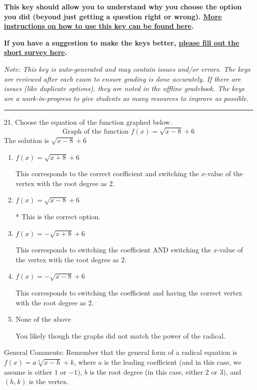 \documentclass{extbook}[14pt]
\begin{document}
\textbf{This key should allow you to understand why you choose the option you did (beyond just getting a question right or wrong). \href{https://xronos.clas.ufl.edu/mac1105spring2020/courseDescriptionAndMisc/Exams/LearningFromResults}{More instructions on how to use this key can be found here}.}

\textbf{If you have a suggestion to make the keys better, \href{https://forms.gle/CZkbZmPbC9XALEE88}{please fill out the short survey here}.}

\textit{Note: This key is auto-generated and may contain issues and/or errors. The keys are reviewed after each exam to ensure grading is done accurately. If there are issues (like duplicate options), they are noted in the offline gradebook. The keys are a work-in-progress to give students as many resources to improve as possible.}

\rule{\textwidth}{0.4pt}

21. Choose the equation of the function graphed below.
\[ \text{Graph of the function } f(x) = \sqrt{x - 8} + 6 \] 
The solution is $ \sqrt{x - 8} + 6 $ 

\begin{enumerate}[label=\Alph*.] 
\item $ f(x) = \sqrt{x + 8} + 6 $ 

 This corresponds to the correct coefficient and switching the $x$-value of the vertex with the root degree as $2$. 
\item $ f(x) = \sqrt{x - 8} + 6 $ 

 * This is the correct option. 
\item $ f(x) = - \sqrt{x + 8} + 6 $ 

 This corresponds to switching the coefficient AND switching the $x$-value of the vertex with the root degree as $2$. 
\item $ f(x) = - \sqrt{x - 8} + 6 $ 

 This corresponds to switching the coefficient and having the correct vertex with the root degree as $2$. 
\item $ \text{None of the above} $ 

 You likely though the graphs did not match the power of the radical. 
\end{enumerate} 
 
General Comments: Remember that the general form of a radical equation is $ f(x) = a \sqrt[b]{x - h} + k$, where $a$ is the leading coefficient (and in this case, we assume is either $1$ or $-1$), $b$ is the root degree (in this case, either $2$ or $3$), and $(h, k)$ is the vertex.
\end{document}
